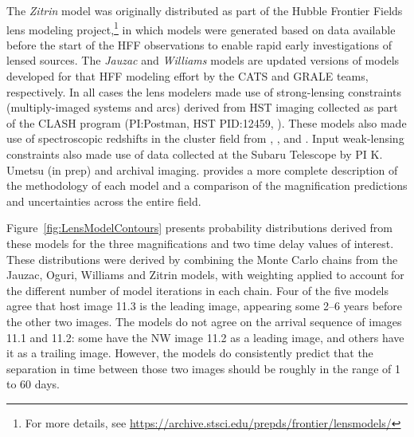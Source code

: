 The {\it Zitrin} model was originally distributed as part of the
Hubble Frontier Fields lens modeling project,\footnote{For more
  details, see
  \url{https://archive.stsci.edu/prepds/frontier/lensmodels/}} in
which models were generated based on data available before the start
of the HFF observations to enable rapid early investigations of lensed
sources. The {\it Jauzac} and {\it Williams} models are updated
versions of models developed for that HFF modeling effort by the CATS
and GRALE teams, respectively.  In all cases the lens modelers made
use of strong-lensing constraints (multiply-imaged systems and arcs)
derived from HST imaging collected as part of the CLASH program
(PI:Postman, HST PID:12459, \citealt{Postman:2012}). These models also
made use of spectroscopic redshifts in the cluster field from
\citet{Mann:2012}, \citet{Christensen:2012}, and \citet{Grillo:2015a}.
Input weak-lensing constraints also made use of data collected at the
Subaru Telescope by PI K. Umetsu (in prep) and archival imaging.
\citet{Priewe:2016} provides a more complete description of the
methodology of each model and a comparison of the magnification
predictions and uncertainties across the entire  field.

Figure~\ref{fig:LensModelContours} presents probability distributions
derived from these models for the three magnifications and two time
delay values of interest.  These distributions were derived by
combining the Monte Carlo chains from the Jauzac, Oguri, Williams and
Zitrin models, with weighting applied to account for the different
number of model iterations in each chain. Four of the five models
agree that host image 11.3 is the leading image, appearing some 2--6
years before the other two images.  The models do not agree on the
arrival sequence of images 11.1 and 11.2: some have the NW image 11.2
as a leading image, and others have it as a trailing image.  However,
the models do consistently predict that the separation in time between
those two images should be roughly in the range of 1 to 60 days.



